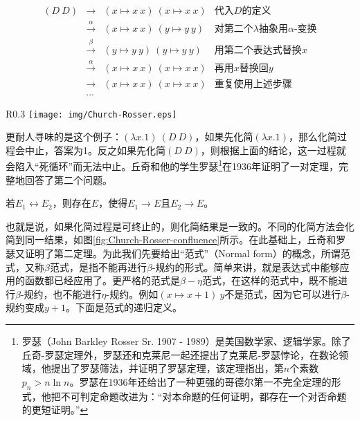 \documentclass{article}
\begin{document}
\[
\begin{array}{rcll}
(D\ D) & \to & (x \mapsto x\ x)\ (x \mapsto x\ x) & \text{代入$D$的定义} \\
       & \xrightarrow{\alpha} & (x \mapsto x\ x)\ (y \mapsto y\ y) & \text{对第二个$\lambda$抽象用$\alpha$-变换} \\
       & \xrightarrow{\beta} & (y \mapsto y\ y)\ (y \mapsto y\ y) & \text{用第二个表达式替换$x$} \\
       & \xrightarrow{\alpha} & (x \mapsto x\ x)\ (x \mapsto x\ x) & \text{再用$x$替换回$y$} \\
       & \to & (x \mapsto x\ x)\ (x \mapsto x\ x) & \text{重复使用上述步骤} \\
       & ... &
\end{array}
\]

\begin{wrapfigure}{R}{0.3\textwidth}
 \centering
 \texttt{[image: img/Church-Rosser.eps]}
 \caption{丘奇-罗瑟定理的示意}
 \label{fig:Church-Rosser-confluence}
\end{wrapfigure}

更耐人寻味的是这个例子：$(\lambda x . 1)\ (D\ D)$，如果先化简$(\lambda x . 1)$，那么化简过程会中止，答案为1。反之如果先化简$(D\ D)$，则根据上面的结论，这一过程就会陷入“死循环”而无法中止。丘奇和他的学生罗瑟\footnote{罗瑟（John Barkley Rosser Sr. 1907 - 1989）是美国数学家、逻辑学家。除了丘奇-罗瑟定理外，罗瑟还和克莱尼一起还提出了克莱尼-罗瑟悖论，在数论领域，他提出了罗瑟筛法，并证明了罗瑟定理，该定理指出，第$n$个素数$p_n > n \ln n$。罗瑟在1936年还给出了一种更强的哥德尔第一不完全定理的形式，他把不可判定命题改进为：“对本命题的任何证明，都存在一个对否命题的更短证明。”}在1936年证明了一对定理，完整地回答了第二个问题。

\begin{theorem}[丘奇-罗瑟定理一]
若$E_1 \leftrightarrow E_2$，则存在$E$，使得$E_1 \to E$且$E_2 \to E$。
\end{theorem}

也就是说，如果化简过程是可终止的，则化简结果是一致的。不同的化简方法会化简到同一结果，如图\ref{fig:Church-Rosser-confluence}所示。在此基础上，丘奇和罗瑟又证明了第二定理。为此我们先要给出“范式”（Normal form）的概念，所谓范式，又称$\beta$范式，是指不能再进行$\beta$-规约的形式。简单来讲，就是表达式中能够应用的函数都已经应用了。更严格的范式是$\beta-\eta$范式，在这样的范式中，既不能进行$\beta$-规约，也不能进行$\eta$-规约。例如$(x \mapsto x + 1)\ y$不是范式，因为它可以进行$\beta$-规约变成$y + 1$。下面是范式的递归定义。
\end{document}

